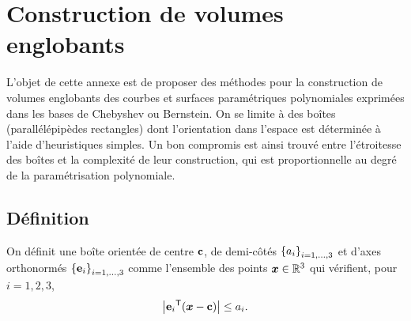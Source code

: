 \chapter{Construction de volumes englobants}%
\label{app:obb}

L'objet de cette annexe est de proposer des méthodes pour la construction de volumes englobants des courbes et surfaces paramétriques polynomiales exprimées dans les bases de Chebyshev ou Bernstein.
On se limite à des boîtes (parallélépipèdes rectangles) dont l'orientation dans l'espace est déterminée à l'aide d'heuristiques simples. Un bon compromis est ainsi trouvé entre l'étroitesse des boîtes et la complexité de leur construction, qui est proportionnelle au degré de la paramétrisation polynomiale.


\section{Définition}
On définit une boîte orientée de centre $\mathbf{c}$, de demi-côtés $\left\{{a}_{i}\right\}_{{i}={1},\ldots,{3}}$ et d'axes orthonormés $\left\{{\mathbf{e}}_{i}\right\}_{{i}={1},\ldots,{3}}$ comme l'ensemble des points $\boldsymbol{x} \in \mathbb{R}^3$ qui vérifient, pour $i=1,2,3$,
\begin{equation}
	\left| {\mathbf{e}_i} ^\mathsf{T} {\left(\boldsymbol{x} - \mathbf{c}\right)} \right| \leq a_i.
	\label{eq:def_obb}
\end{equation}

